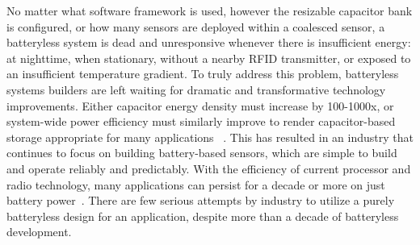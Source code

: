 No matter what software framework is used, however the resizable capacitor bank is configured, or how many sensors are deployed within a coalesced sensor, a batteryless system is dead and unresponsive whenever there is insufficient energy: at nighttime, when stationary, without a nearby RFID transmitter, or exposed to an insufficient temperature gradient.
To truly address this problem, batteryless systems builders are left waiting for dramatic and transformative technology improvements. Either capacitor energy density must increase by 100-1000x, or system-wide power efficiency must similarly improve
to render capacitor-based storage appropriate for many applications
~\cite{curtiss2021facebit}.
This has resulted in an industry that continues to focus on building battery-based sensors, which are simple to build and operate reliably and predictably.
With the efficiency of current processor and radio technology, many applications can persist for a decade or more on just battery power~\cite{emersonRosemount,GEInsightMesh,honeywellOneWireless}.
There are few serious attempts by industry to utilize a purely batteryless design for an application, despite more than a decade of batteryless development.

